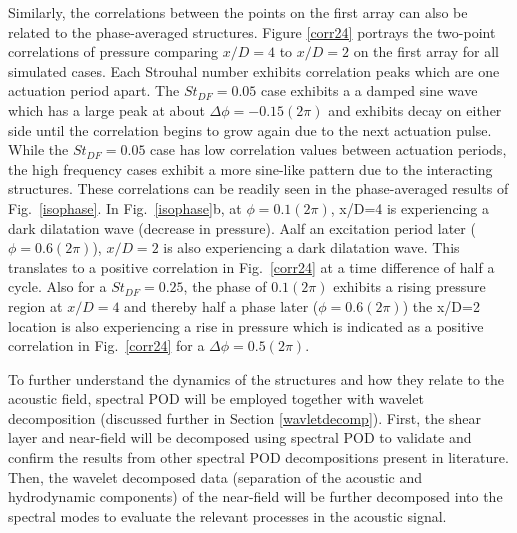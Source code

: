 \documentclass[english]{aiaa-tc}
\begin{document}
Similarly, the correlations between the points on the first array can
also be related to the phase-averaged structures. Figure \ref{corr24}
portrays the two-point correlations of pressure comparing $x/D=4$ to
$x/D=2$ on the first array for all simulated 
cases. Each Strouhal number exhibits correlation peaks which are one
actuation period apart. The $St_{DF}=0.05$ case exhibits a a damped sine wave which has a large peak
at about $\Delta \phi=-0.15(2\pi)$ 
and exhibits decay on either
side until the correlation begins to grow again due to the next
actuation pulse. While the $St_{DF}=0.05$ case has low correlation
values between actuation periods, the high frequency cases exhibit a
more sine-like pattern due to the interacting structures.  These
correlations can be readily seen in the phase-averaged results of
Fig.~\ref{isophase}. In Fig.~\ref{isophase}b, at $\phi=0.1(2\pi)$,
x/D=4 is experiencing a dark dilatation wave (decrease in pressure). 
Aalf an excitation period later ($\phi=0.6(2\pi)$), $x/D=2$ is also
experiencing a dark dilatation wave. This translates to a
positive correlation in Fig.~\ref{corr24} at a time difference of half
a cycle. Also for a
$St_{DF}=0.25$, the phase of $0.1(2\pi)$ exhibits a rising pressure
region at $x/D=4$ and thereby half a phase later ($\phi=0.6(2\pi)$)
the x/D=2 location is also experiencing a rise in pressure which is
indicated as a positive correlation in Fig.~\ref{corr24} for a $\Delta
\phi=0.5(2\pi)$. 

To further understand the dynamics of the structures and how they
relate to the acoustic field, spectral POD will be employed together
with wavelet decomposition (discussed further in Section
\ref{wavletdecomp}). First, the shear layer and near-field will be
decomposed using spectral POD to validate and confirm the results from
other spectral POD decompositions present in
literature.\cite{jordan2007,Arndt1997,freund2002} Then, the wavelet
decomposed data (separation of the acoustic and hydrodynamic
components) of the near-field will be further decomposed into the spectral
modes to evaluate the relevant processes in the acoustic signal. 
\end{document}
